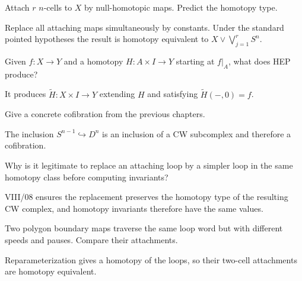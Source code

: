 \begin{problem}\label{prob:viii08-11}
Attach \(r\) \(n\)-cells to \(X\) by null-homotopic maps. Predict the homotopy type.
\end{problem}
\begin{solution}
Replace all attaching maps simultaneously by constants.  Under the standard pointed hypotheses the result is homotopy equivalent to \(X\vee\bigvee_{j=1}^rS^n\).
\end{solution}

\begin{problem}\label{prob:viii08-12}
Given \(f:X\to Y\) and a homotopy \(H:A\times I\to Y\) starting at \(f|_A\), what does HEP produce?
\end{problem}
\begin{solution}
It produces \(\widetilde H:X\times I\to Y\) extending \(H\) and satisfying \(\widetilde H(-,0)=f\).
\end{solution}

\begin{problem}\label{prob:viii08-13}
Give a concrete cofibration from the previous chapters.
\end{problem}
\begin{solution}
The inclusion \(S^{n-1}\hookrightarrow D^n\) is an inclusion of a CW subcomplex and therefore a cofibration.
\end{solution}

\begin{problem}\label{prob:viii08-14}
Why is it legitimate to replace an attaching loop by a simpler loop in the same homotopy class before computing invariants?
\end{problem}
\begin{solution}
VIII/08 ensures the replacement preserves the homotopy type of the resulting CW complex, and homotopy invariants therefore have the same values.
\end{solution}

\begin{problem}\label{prob:viii08-15}
Two polygon boundary maps traverse the same loop word but with different speeds and pauses. Compare their attachments.
\end{problem}
\begin{solution}
Reparameterization gives a homotopy of the loops, so their two-cell attachments are homotopy equivalent.
\end{solution}

